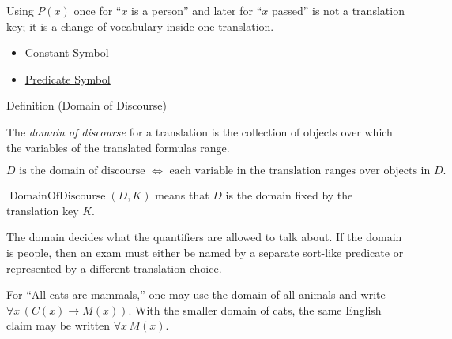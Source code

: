 \begin{remark*}
Using \(P(x)\) once for ``\(x\) is a person'' and later for ``\(x\) passed'' is
not a translation key; it is a change of vocabulary inside one translation.
\end{remark*}

\begin{dependencies}
\begin{itemize}
  \item \hyperref[def:constant-symbol]{Constant Symbol}
  \item \hyperref[def:predicate-symbol]{Predicate Symbol}
\end{itemize}
\end{dependencies}

\begin{definitionbox}{Definition (Domain of Discourse)}
\begin{definition}
\label{def:domain-of-discourse-predicate-logic}
The \emph{domain of discourse} for a translation is the collection of objects
over which the variables of the translated formulas range.
\end{definition}
\end{definitionbox}

\begin{remark*}
\[
D \text{ is the domain of discourse }
\Longleftrightarrow
\text{ each variable in the translation ranges over objects in }D.
\]
\end{remark*}

\begin{remark*}
\(\operatorname{DomainOfDiscourse}(D,K)\) means that \(D\) is the domain fixed
by the translation key \(K\).
\end{remark*}

\begin{remark*}[Interpretation]
The domain decides what the quantifiers are allowed to talk about. If the
domain is people, then an exam must either be named by a separate sort-like
predicate or represented by a different translation choice.
\end{remark*}

\begin{remark*}[Examples]
For ``All cats are mammals,'' one may use the domain of all animals and write
\(\forall x\,(C(x)\to M(x))\). With the smaller domain of cats, the same English
claim may be written \(\forall x\,M(x)\).
\end{remark*}

